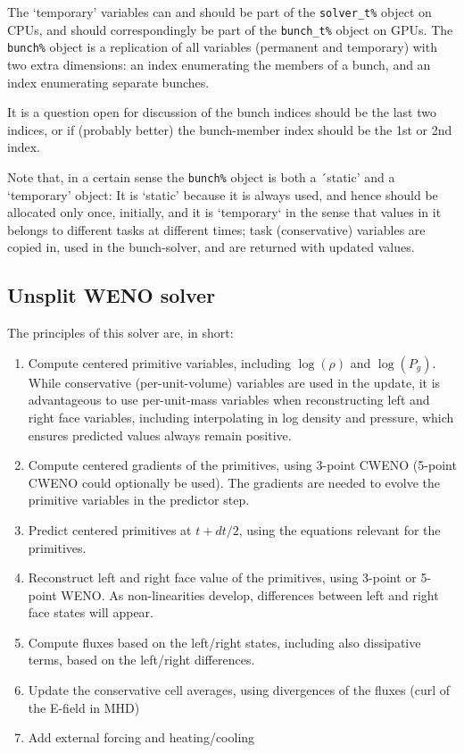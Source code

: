 \documentclass[paper=a4,fontsize=11pt]{scrartcl}
\numberwithin{equation}{section}		%
\numberwithin{figure}{section}			%
\numberwithin{table}{section}				%
\begin{document}
The `temporary' variables can and should be part of the \verb:solver_t%: object on CPUs, and should correspondingly be part of the \verb:bunch_t%: object on GPUs.  The \verb:bunch%: object is a replication of all variables (permanent and temporary) with two extra dimensions: an index enumerating the members of a bunch, and an index enumerating separate bunches.

It is a question open for discussion of the bunch indices should be the last two indices, or if (probably better) the bunch-member index should be the 1st or 2nd index. 

Note that, in a certain sense the \verb:bunch%: object is both a ´static' and a `temporary' object:  It is `static' because it is always used, and hence should be allocated only once, initially, and it is `temporary` in the sense that values in it belongs to different tasks at different times; task (conservative) variables are copied in, used in the bunch-solver, and are returned with updated values.

\subsection{Unsplit WENO solver}
The principles of this solver are, in short:
\begin{enumerate}
    \item Compute centered primitive variables, including $\log(\rho)$ and $\log(P_{g})$.  While conservative (per-unit-volume) variables are used in the update, it is advantageous to use per-unit-mass variables when reconstructing left and right face variables, including interpolating in log density and pressure, which ensures predicted values always remain positive.
    \item Compute centered gradients of the primitives, using 3-point CWENO (5-point CWENO could optionally be used).  The gradients are needed to evolve the primitive variables in the predictor step.
    \item Predict centered primitives at $t+dt/2$, using the equations relevant for the primitives.
    \item Reconstruct left and right face value of the primitives, using 3-point or 5-point WENO.  As non-linearities develop, differences between left and right face states will appear.
    \item Compute fluxes based on the left/right states, including also dissipative terms, based on the left/right differences.
    \item Update the conservative cell averages, using divergences of the fluxes (curl of the E-field in MHD)
    \item Add external forcing and heating/cooling
\end{enumerate}
\end{document}
